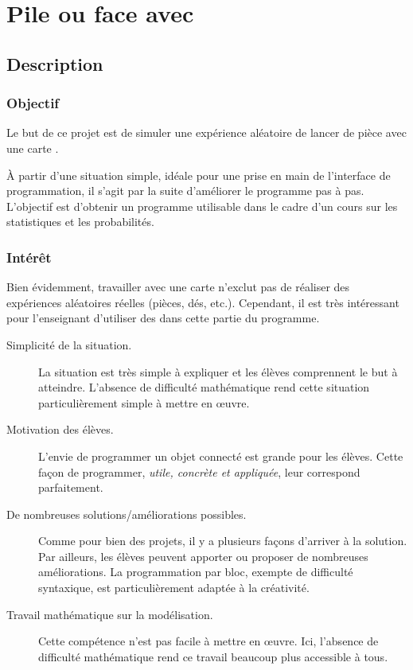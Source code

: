 

\section{Pile ou face avec \mb}


\subsection{Description}

\subsubsection{Objectif}

\begin{formule}
Le but de ce projet est de simuler une expérience aléatoire de lancer de pièce avec une carte \mb.

À partir d’une situation simple, idéale pour une prise en main de l’interface de programmation, il s’agit par la suite d’améliorer le programme pas à pas. L’objectif est d’obtenir un programme utilisable dans le cadre d’un cours sur les statistiques et les probabilités.
\end{formule}

\subsubsection{Intérêt}

Bien évidemment, travailler avec une carte \mb n'exclut pas de réaliser des expériences aléatoires réelles (pièces, dés, etc.). Cependant, il est très intéressant pour l'enseignant d'utiliser des \mb dans cette partie du programme.

\begin{description}
    \item [Simplicité de la situation.] La situation est très simple à expliquer et les élèves comprennent le but à atteindre. L'absence de difficulté mathématique rend cette situation particulièrement simple à mettre en œuvre.
    \item [Motivation des élèves.] L'envie de programmer un objet connecté est grande pour les élèves. Cette façon de programmer, \emph{utile, concrète et appliquée}, leur correspond parfaitement.
    \item [De nombreuses solutions/améliorations possibles.] Comme pour bien des projets, il y a plusieurs façons d'arriver à la solution. Par ailleurs, les élèves peuvent apporter ou proposer de nombreuses améliorations. La programmation par bloc, exempte de difficulté syntaxique, est particulièrement adaptée à la créativité.
    \item [Travail mathématique sur la modélisation.] Cette compétence n'est pas facile à mettre en œuvre. Ici, l'absence de difficulté mathématique rend ce travail beaucoup plus accessible à tous.
\end{description}


